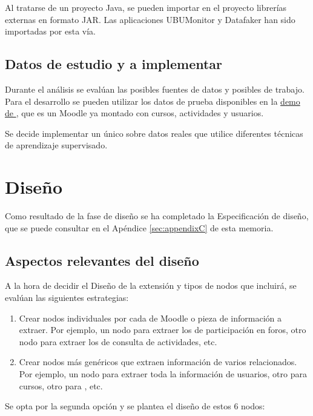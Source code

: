 Al tratarse de un proyecto Java, se pueden importar en el proyecto librerías externas en formato JAR. Las aplicaciones UBUMonitor y Datafaker 
han sido importadas por esta vía. 


\subsection{Datos de estudio y  a implementar}

Durante el análisis se evalúan las posibles fuentes de datos y posibles  de trabajo. Para el desarrollo se pueden 
utilizar los datos de prueba disponibles en la \href{https://school.moodledemo.net/}{demo de }, que es un 
Moodle ya montado con cursos, actividades y usuarios. 
\

Se decide implementar un único  sobre datos reales que utilice diferentes técnicas de aprendizaje supervisado. 

\newpage
\section{Diseño}

Como resultado de la fase de diseño se ha completado la Especificación de diseño, que se puede consultar en el Apéndice \ref{sec:appendixC} de esta memoria. 

\subsection{Aspectos relevantes del diseño}

A la hora de decidir el Diseño de la extensión y tipos de nodos que incluirá, se evalúan las siguientes estrategias: 

\begin{enumerate}
	\item Crear nodos individuales por cada  de Moodle o pieza de información a extraer. Por ejemplo, un nodo 
	para extraer los  de participación en foros, otro nodo para extraer los  de consulta de actividades, etc. 
	\item Crear nodos más genéricos que extraen información de varios  relacionados. Por ejemplo, 
	un nodo para extraer toda la información de usuarios, otro para cursos, otro para , etc. 
\end{enumerate}

Se opta por la segunda opción y se plantea el diseño de estos 6 nodos: 

